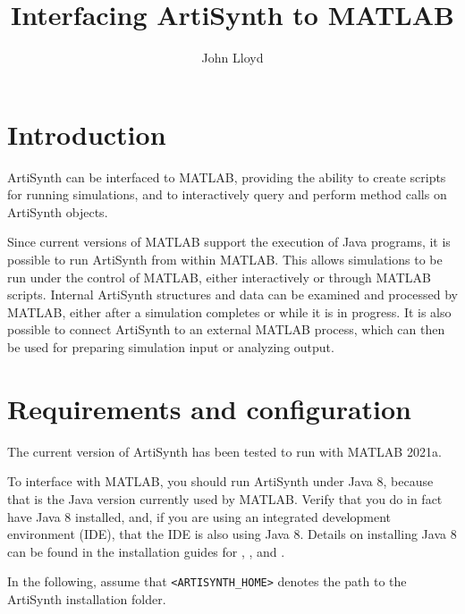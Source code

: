\documentclass{article}
\title{Interfacing ArtiSynth to MATLAB}
\author{John Lloyd}
\date{}
\begin{document}
\maketitle

\iflatexml{\large\pubdate}\fi

\tableofcontents


\section{Introduction}

ArtiSynth can be interfaced to MATLAB, providing the ability to create
scripts for running simulations, and to interactively query and
perform method calls on ArtiSynth objects.

Since current versions of MATLAB support the execution of Java
programs, it is possible to run ArtiSynth from within MATLAB.  This
allows simulations to be run under the control of MATLAB, either
interactively or through MATLAB scripts. Internal ArtiSynth structures
and data can be examined and processed by MATLAB, either after a
simulation completes or while it is in progress. It is also possible
to connect ArtiSynth to an external MATLAB process, which can then be
used for preparing simulation input or analyzing output.

\section{Requirements and configuration}
\label{Requirements:sec}

The current version of ArtiSynth has been tested to run with MATLAB
2021a.

To interface with MATLAB, you should run ArtiSynth under Java 8,
because that is the Java version currently used by MATLAB.  Verify
that you do in fact have Java 8 installed, and, if you are using an
integrated development environment (IDE), that the IDE is also using
Java 8.  Details on installing Java 8 can be found in the installation
guides for
,
,
and
.

In the following, assume that {\tt <ARTISYNTH\_HOME>} denotes the path
to the ArtiSynth installation folder.
\end{document}
